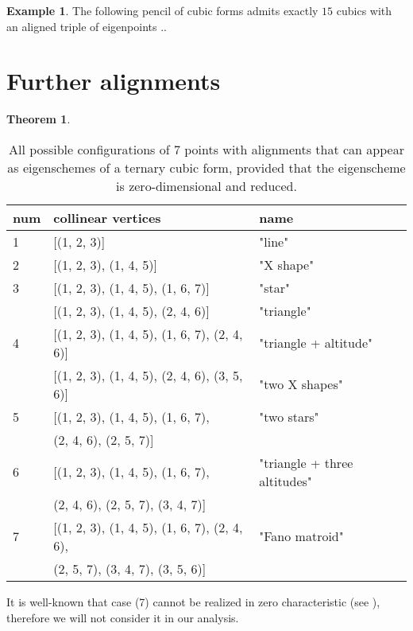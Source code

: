 \documentclass[12pt, a4paper, reqno, captions=tableheading,bibliography=totoc]{scrartcl}
\theoremstyle{plain}
\newtheorem{theorem}[lemma]{Theorem}
\theoremstyle{definition}
\newtheorem{es}[lemma]{Example}
\begin{document}
\begin{es}
The following pencil of cubic forms admits exactly $15$ cubics with an aligned triple of eigenpoints ..
\end{es}

\section{Further alignments}


\begin{theorem}
\label{theorem:possible_alignments}

\end{theorem}

\begin{table}
\label{table:all_alignments}
\caption{All possible configurations of $7$ points with alignments that can appear as eigenschemes of a ternary cubic form, provided that the eigenscheme is zero-dimensional and reduced.}
\centering
\begin{tabular}{|lll|}\hline
  num & collinear vertices & name\\ \hline
 1& [(1, 2, 3)] & "line" \\
 2& [(1, 2, 3), (1, 4, 5)] & "X shape"\\
 3& [(1, 2, 3), (1, 4, 5), (1, 6, 7)] & "star" \\
  & [(1, 2, 3), (1, 4, 5), (2, 4, 6)] & "triangle" \\
 4& [(1, 2, 3), (1, 4, 5), (1, 6, 7), (2, 4, 6)] & "triangle + altitude" \\
  & [(1, 2, 3), (1, 4, 5), (2, 4, 6), (3, 5, 6)] & "two X shapes" \\
 5& [(1, 2, 3), (1, 4, 5), (1, 6, 7),  & "two stars"\\
  & \phantom{[}(2, 4, 6), (2, 5, 7)] & \\
 6& [(1, 2, 3), (1, 4, 5), (1, 6, 7), & "triangle + three altitudes"\\
  & \phantom{[} (2, 4, 6), (2, 5, 7), (3, 4, 7)] & \\
 7& [(1, 2, 3),
   (1, 4, 5),
   (1, 6, 7),
   (2, 4, 6), & "Fano matroid" \\
  & \phantom{[} (2, 5, 7),
   (3, 4, 7),
   (3, 5, 6)] & \\ \hline
\end{tabular}
\end{table}

It is well-known that case (7) cannot be realized in zero characteristic (see \cite{Whitney1935}), therefore we will not consider it in our analysis.
\end{document}
